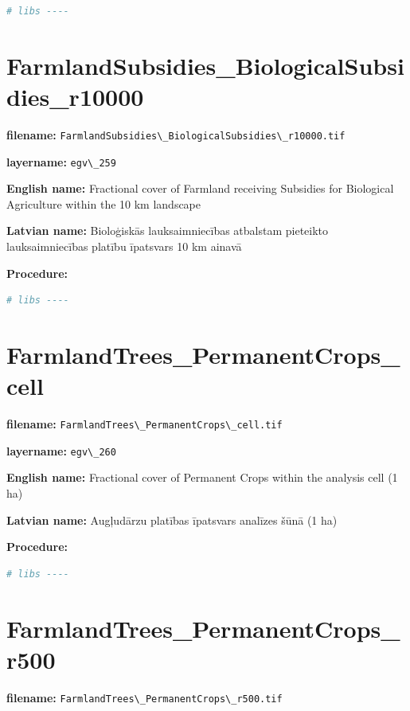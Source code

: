 \documentclass[
]{book}
\newcommand{\passthrough}[1]{#1}
\begin{document}
\begin{lstlisting}[language=R]
# libs ----
\end{lstlisting}

\section{FarmlandSubsidies\_BiologicalSubsidies\_r10000}\label{ch06.259}

\textbf{filename:} \passthrough{\lstinline!FarmlandSubsidies\_BiologicalSubsidies\_r10000.tif!}

\textbf{layername:} \passthrough{\lstinline!egv\_259!}

\textbf{English name:} Fractional cover of Farmland receiving Subsidies for Biological Agriculture within the 10 km landscape

\textbf{Latvian name:} Bioloģiskās lauksaimniecības atbalstam pieteikto lauksaimniecības platību īpatsvars 10 km ainavā

\textbf{Procedure:}

\begin{lstlisting}[language=R]
# libs ----
\end{lstlisting}

\section{FarmlandTrees\_PermanentCrops\_cell}\label{ch06.260}

\textbf{filename:} \passthrough{\lstinline!FarmlandTrees\_PermanentCrops\_cell.tif!}

\textbf{layername:} \passthrough{\lstinline!egv\_260!}

\textbf{English name:} Fractional cover of Permanent Crops within the analysis cell (1 ha)

\textbf{Latvian name:} Augļudārzu platības īpatsvars analīzes šūnā (1 ha)

\textbf{Procedure:}

\begin{lstlisting}[language=R]
# libs ----
\end{lstlisting}

\section{FarmlandTrees\_PermanentCrops\_r500}\label{ch06.261}

\textbf{filename:} \passthrough{\lstinline!FarmlandTrees\_PermanentCrops\_r500.tif!}
\end{document}
